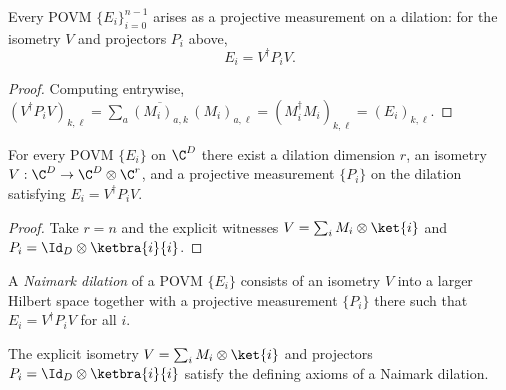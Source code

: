 \begin{theorem}\label{thm:naimark_recovers_povm}
    \leanok
    Every POVM $\{E_i\}_{i=0}^{n-1}$ arises as a projective measurement on a
    dilation: for the isometry $V$ and projectors $P_i$ above,
    \[
        E_i = V^\dagger P_i V.
    \]
\end{theorem}

\begin{proof}
    \leanok
    Computing entrywise,
    $(V^\dagger P_i V)_{k,\ell}
        = \sum_{a} \overline{(M_i)_{a,k}}\,(M_i)_{a,\ell}
        = (M_i^\dagger M_i)_{k,\ell}
        = (E_i)_{k,\ell}$.
\end{proof}

\begin{theorem}\label{thm:exists_naimark_dilation}
    \leanok
    For every POVM $\{E_i\}$ on $\C^D$ there exist a dilation dimension $r$,
    an isometry $V : \C^D \to \C^D \otimes \C^r$, and a projective
    measurement $\{P_i\}$ on the dilation satisfying $E_i = V^\dagger P_i V$.
\end{theorem}

\begin{proof}
    \leanok
    Take $r = n$ and the explicit witnesses $V = \sum_i M_i \otimes \ket{i}$
    and $P_i = \Id_D \otimes \ketbra{i}{i}$.
\end{proof}

\begin{definition}
    \label{def:is_naimark_dilation}
    \leanok
    A \emph{Naimark dilation} of a POVM $\{E_i\}$ consists of an isometry
    $V$ into a larger Hilbert space together with a projective measurement
    $\{P_i\}$ there such that $E_i = V^\dagger P_i V$ for all $i$.
\end{definition}

\begin{theorem}
    \label{thm:is_naimark_dilation_naimark}
    \leanok
    The explicit isometry $V = \sum_i M_i \otimes \ket{i}$ and projectors
    $P_i = \Id_D \otimes \ketbra{i}{i}$ satisfy the defining axioms
    of a Naimark dilation.
\end{theorem}

